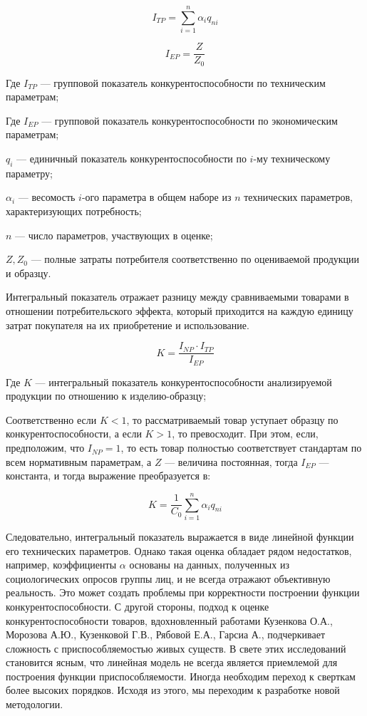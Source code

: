 \documentclass[14pt, a4paper]{extarticle}
\begin{document}
  \[
  I_{TP} = \sum_{i=1}^n \alpha_i q_{ni}
  \]
  
  \[
  I_{EP} = \frac{Z}{Z_0}
  \]
  
  Где \(I_{TP}\) — групповой показатель конкурентоспособности по техническим параметрам;
  
  Где \(I_{EP}\) — групповой показатель конкурентоспособности по экономическим параметрам;
  
  \(q_{i}\) — единичный показатель конкурентоспособности по \(i\)-му техническому параметру;
  
  \(\alpha_i\) — весомость \(i\)-ого параметра в общем наборе из \(n\) технических параметров, характеризующих потребность;
  
  \(n\) — число параметров, участвующих в оценке;
  
  \(Z, Z_0\) — полные затраты потребителя соответственно по оцениваемой продукции и образцу.
  
  Интегральный показатель отражает разницу между сравниваемыми товарами в отношении потребительского эффекта, который приходится на каждую единицу затрат покупателя на их приобретение и использование.

  \[
  K = \frac{I_{NP} \cdot I_{TP}}{I_{EP}}
  \]
  
  Где \(K\) — интегральный показатель конкурентоспособности анализируемой продукции по отношению к изделию-образцу;
  
  Соответственно если \(K < 1\), то рассматриваемый товар уступает образцу по конкурентоспособности, а если \(K > 1\), то превосходит. При этом, если, предположим, что \(I_{NP} = 1\), то есть товар полностью соответствует стандартам по всем нормативным параметрам, а \(Z\) — величина постоянная, тогда \(I_{EP}\) — константа, и тогда выражение преобразуется в:
  
  \[
  K = \frac{1}{C_0} \sum_{i=1}^n \alpha_i q_{ni}
  \]
  
  Следовательно, интегральный показатель выражается в виде линейной функции его технических параметров. Однако такая оценка обладает рядом недостатков, например, коэффициенты \(\alpha\) основаны на данных, полученных из социологических опросов группы лиц, и не всегда отражают объективную реальность. Это может создать проблемы при корректности построении функции конкурентоспособности. С другой стороны, подход к оценке конкурентоспособности товаров, вдохновленный работами Кузенкова О.А., Морозова А.Ю., Кузенковой Г.В., Рябовой Е.А., Гарсиа А., подчеркивает сложность с приспособляемостью живых существ. В свете этих исследований становится ясным, что линейная модель не всегда является приемлемой для построения функции приспособляемости. Иногда необходим переход к сверткам более высоких порядков. Исходя из этого, мы переходим к разработке новой методологии.
  
\end{document}
